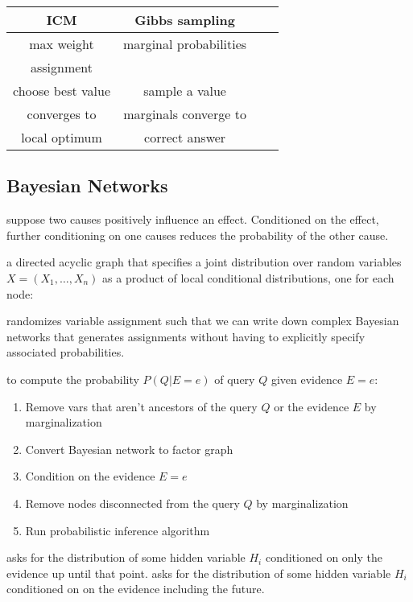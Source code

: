 \begin{tabular}{|c|c|c|c|} 
    \hline
    \textbf{ICM} & \textbf{Gibbs sampling} \\
    \hline
    max weight & marginal probabilities \\ 
    assignment &   \\ 
    \hline
    choose best value & sample a value \\
    \hline
    converges to & marginals converge to\\
    local optimum & correct answer \\
    \hline
\end{tabular}


\subsection{Bayesian Networks}

 suppose two causes positively influence an effect.
Conditioned on the effect, further conditioning on one causes reduces the
probability of the other cause.

 a directed acyclic graph that specifies a joint distribution
over random variables $X=(X_1,\dots,X_n)$ as a product of local conditional distributions,
one for each node: 

 randomizes variable assignment such that we can
write down complex Bayesian networks that generates assignments without having
to explicitly specify associated probabilities.

 to compute the probability $P(Q|E=e)$
of query $Q$ given evidence $E=e$:
\begin{enumerate}
    \item Remove vars that aren't ancestors of the query $Q$ or the evidence $E$ by marginalization
    \item Convert Bayesian network to factor graph
    \item Condition on the evidence $E=e$
    \item Remove nodes disconnected from the query $Q$ by marginalization
    \item Run probabilistic inference algorithm
\end{enumerate}
 asks for the distribution of some hidden variable
$H_i$ conditioned on only the evidence up until that point. 
 asks for the distribution of some hidden variable
$H_i$ conditioned on on the evidence including the future. 

